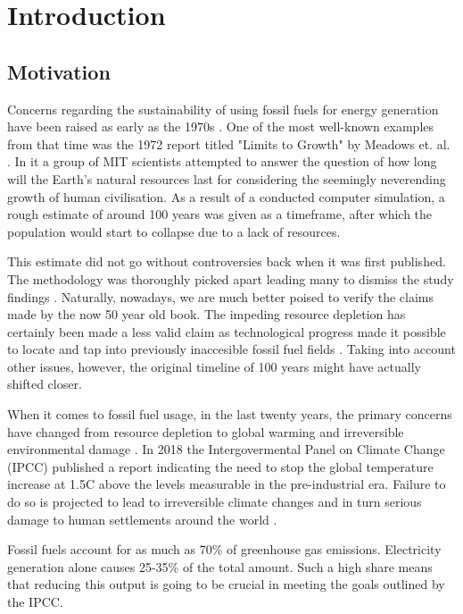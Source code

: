 \section{Introduction}


\subsection{Motivation}


Concerns regarding the sustainability of using fossil fuels for energy generation
have been raised as early as the 1970s \cite{rethinking_resource_depletion}. 
One of the most well-known examples from that time was the 1972 report
titled "Limits to Growth" by Meadows et. al. \cite{limits_to_growth}.
In it a group of MIT scientists attempted to answer the question of
how long will the Earth's natural resources last for
considering the seemingly neverending growth of human civilisation.
As a result of a conducted computer simulation,
a rough estimate of around 100 years was given as a timeframe,
after which the population would start to collapse due to a lack of resources.


This estimate did not go without controversies back when it was first published.
The methodology was thoroughly picked apart leading many to dismiss the study findings
\cite{rethinking_resource_depletion}. Naturally, nowadays, we are much better poised to verify
the claims made by the now 50 year old book. The impeding resource depletion
has certainly been made a less valid claim as technological progress
made it possible to locate and tap into previously inaccesible fossil fuel fields
\cite{shaping_the_global_oil_peak}.
Taking into account other issues, however, the original timeline of 100 years might have
actually shifted closer. 


When it comes to fossil fuel usage, in the last twenty years, 
the primary concerns have changed from resource depletion to global warming 
and irreversible environmental damage \cite{rethinking_resource_depletion}.
In 2018 the Intergovermental Panel on Climate Change (IPCC) published a
report indicating the need to stop the global temperature increase 
at 1.5\degree C above the levels measurable in the pre-industrial era.
Failure to do so is projected to lead to irreversible climate changes and in turn
serious damage to human settlements around the world \cite{ipcc2018}.


Fossil fuels account for as much as 70\% of greenhouse gas emissions.
Electricity generation alone causes 25-35\% 
\cite{global_climate_change} of the total amount.
Such a high share means that reducing this output
is going to be crucial in meeting the goals outlined by the IPCC.

